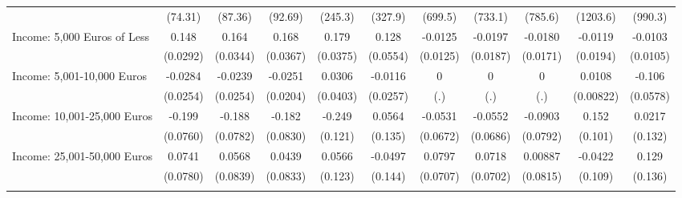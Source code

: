 {\begin{tabular}{l*{10}{c}}
            &     (74.31)         &     (87.36)         &     (92.69)         &     (245.3)         &     (327.9)         &     (699.5)         &     (733.1)         &     (785.6)         &    (1203.6)         &     (990.3)         \\
\addlinespace
Income: 5,000 Euros of Less&       0.148\sym{***}&       0.164\sym{***}&       0.168\sym{***}&       0.179\sym{***}&       0.128\sym{*}  &     -0.0125         &     -0.0197         &     -0.0180         &     -0.0119         &     -0.0103         \\
            &    (0.0292)         &    (0.0344)         &    (0.0367)         &    (0.0375)         &    (0.0554)         &    (0.0125)         &    (0.0187)         &    (0.0171)         &    (0.0194)         &    (0.0105)         \\
\addlinespace
Income: 5,001-10,000 Euros&     -0.0284         &     -0.0239         &     -0.0251         &      0.0306         &     -0.0116         &           0         &           0         &           0         &      0.0108         &      -0.106         \\
            &    (0.0254)         &    (0.0254)         &    (0.0204)         &    (0.0403)         &    (0.0257)         &         (.)         &         (.)         &         (.)         &   (0.00822)         &    (0.0578)         \\
\addlinespace
Income: 10,001-25,000 Euros&      -0.199\sym{**} &      -0.188\sym{*}  &      -0.182\sym{*}  &      -0.249\sym{*}  &      0.0564         &     -0.0531         &     -0.0552         &     -0.0903         &       0.152         &      0.0217         \\
            &    (0.0760)         &    (0.0782)         &    (0.0830)         &     (0.121)         &     (0.135)         &    (0.0672)         &    (0.0686)         &    (0.0792)         &     (0.101)         &     (0.132)         \\
\addlinespace
Income: 25,001-50,000 Euros&      0.0741         &      0.0568         &      0.0439         &      0.0566         &     -0.0497         &      0.0797         &      0.0718         &     0.00887         &     -0.0422         &       0.129         \\
            &    (0.0780)         &    (0.0839)         &    (0.0833)         &     (0.123)         &     (0.144)         &    (0.0707)         &    (0.0702)         &    (0.0815)         &     (0.109)         &     (0.136)         \\
\addlinespace

\end{tabular}}
